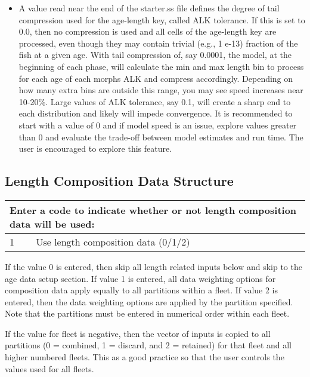 \begin{itemize}
	\item A value read near the end of the starter.ss file defines the degree of tail compression used for the age-length key, called ALK tolerance.  If this is set to 0.0, then no compression is used and all cells of the age-length key are processed, even though they may contain trivial (e.g., 1 e-13) fraction of the fish at a given age.  With tail compression of, say 0.0001, the model, at the beginning of each phase, will calculate the min and max length bin to process for each age of each morphs ALK and compress accordingly.  Depending on how many extra bins are outside this range, you may see speed increases near 10-20\%.  Large values of ALK tolerance, say 0.1, will create a sharp end to each distribution and likely will impede convergence.  It is recommended to start with a value of 0 and if model speed is an issue, explore values greater than 0 and evaluate the trade-off between model estimates and run time.  The user is encouraged to explore this feature.
\end{itemize}


\subsection{Length Composition Data Structure}
\begin{tabular}{p{2cm} p{13cm}}
		\multicolumn{2}{l}{Enter a code to indicate whether or not length composition data will be used:\Tstrut\Bstrut}\\
		\hline	
		1 & Use length composition data (0/1/2)\Tstrut\Bstrut\\
		\hline									  
\end{tabular}

If the value 0 is entered, then skip all length related inputs below and skip to the age data setup section.  If value 1 is entered, all data weighting options for composition data apply equally to all partitions within a fleet. If value 2 is entered, then the data weighting options are applied by the partition specified. Note that the partitions must be entered in numerical order within each fleet.

If the value for fleet is negative, then the vector of inputs is copied to all partitions (0 = combined, 1 = discard, and 2 = retained) for that fleet and all higher numbered fleets. This as a good practice so that the user controls the values used for all fleets.

